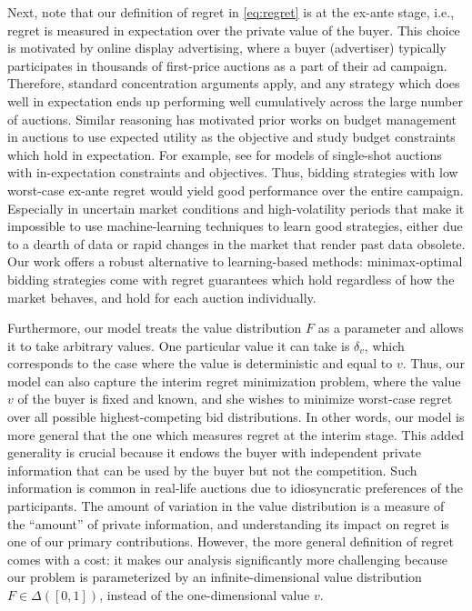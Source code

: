 Next, note that our definition of regret in \eqref{eq:regret} is at the ex-ante stage, i.e., regret is measured in expectation over the private value of the buyer. This choice is motivated by online display advertising, where a buyer (advertiser) typically participates in thousands of first-price auctions as a part of their ad campaign. Therefore, standard concentration arguments apply, and any strategy which does well in expectation ends up performing well cumulatively across the large number of auctions. Similar reasoning has motivated prior works on budget management in auctions to use expected utility as the objective and study budget constraints which hold in expectation. For example, see \citet{gummadi2012repeated, abhishek2013optimal, balseiro2021budget, balseiro2023contextual} for models of single-shot auctions with in-expectation constraints and objectives. Thus, bidding strategies with low worst-case ex-ante regret would yield good performance over the entire campaign. Especially in uncertain market conditions and high-volatility periods that make it impossible to use machine-learning techniques to learn good strategies, either due to a dearth of data or rapid changes in the market that render past data obsolete. Our work offers a robust alternative to learning-based methods: minimax-optimal bidding strategies come with regret guarantees which hold regardless of how the market behaves, and hold for each auction individually.

Furthermore, our model treats the value distribution $F$ as a parameter and allows it to take arbitrary values. One particular value it can take is $\delta_v$, which corresponds to the case where the value is deterministic and equal to $v$. Thus, our model can also capture the interim regret minimization problem, where the value $v$ of the buyer is fixed and known, and she wishes to minimize worst-case regret over all possible highest-competing bid distributions. In other words, our model is more general that the one which measures regret at the interim stage. This added generality is crucial because it endows the buyer with independent private information that can be used by the buyer but not the competition. Such information is common in real-life auctions due to idiosyncratic preferences of the participants. The amount of variation in the value distribution is a measure of the ``amount'' of private information, and understanding its impact on regret is one of our primary contributions. However, the more general definition of regret comes with a cost: it makes our analysis significantly more challenging because our problem is parameterized by an infinite-dimensional value distribution $F \in \Delta([0,1])$, instead of the one-dimensional  value $v$.





